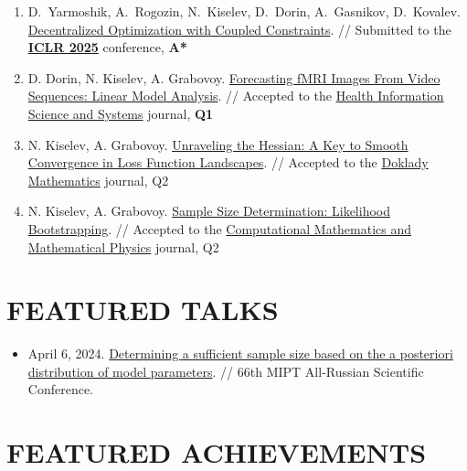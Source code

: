 \documentclass[11pt,a4paper]{moderncv}
\begin{document}
\begin{minipage}[t]{0.62\textwidth}
\begin{enumerate}
    \item D.~Yarmoshik, A.~Rogozin, N.~Kiselev, D.~Dorin, A.~Gasnikov, D.~Kovalev. \href{https://arxiv.org/abs/2407.02020}{Decentralized Optimization with Coupled Constraints}. // Submitted to the \href{https://neurips.cc}{\textbf{ICLR 2025}} conference, \textbf{A*}
    \item D. Dorin, N. Kiselev, A. Grabovoy. \href{https://github.com/DorinDaniil/Forecasting-fMRI-Images}{Forecasting fMRI Images From Video Sequences: Linear Model Analysis}. // Accepted to the \href{https://link.springer.com/journal/13755}{Health Information Science and Systems} journal, \textbf{Q1}
    \item N. Kiselev, A. Grabovoy. \href{https://arxiv.org/abs/2409.11995}{Unraveling the Hessian: A Key to Smooth Convergence in Loss Function Landscapes}. // Accepted to the \href{https://link.springer.com/journal/11472}{Doklady Mathematics} journal, Q2
    \item N. Kiselev, A. Grabovoy. \href{https://github.com/kisnikser/Likelihood-Bootstrapping}{Sample Size Determination: Likelihood Bootstrapping}. // Accepted to the \href{https://link.springer.com/journal/11470}{Computational Mathematics and Mathematical Physics} journal, Q2
\end{enumerate}

\section{FEATURED TALKS}

\begin{itemize}
\item April 6, 2024. \href{https://www.youtube.com/live/WnIRaRl730A?si=q0eScgnDP2ZidCpK&t=1723}{Determining a sufficient sample size based on the a posteriori distribution of model parameters}. // 66th MIPT All-Russian Scientific Conference.
\end{itemize}

\section{FEATURED ACHIEVEMENTS}


\end{minipage}
\end{document}
